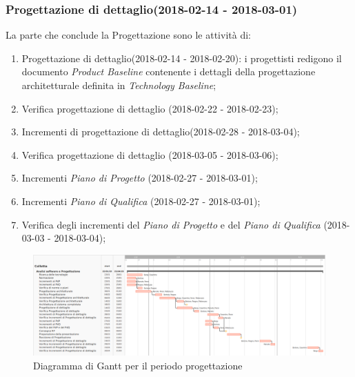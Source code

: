 		\subsubsection{Progettazione di dettaglio(2018-02-14 - 2018-03-01)\\} La parte che conclude la Progettazione sono le attività di:
			\begin{enumerate}
				\item Progettazione di dettaglio(2018-02-14 - 2018-02-20): i progettisti redigono il documento \textit{Product Baseline} contenente i dettagli della progettazione architetturale definita in \textit{Technology Baseline};
				\item Verifica progettazione di dettaglio (2018-02-22 - 2018-02-23);
				\item Incrementi di progettazione di dettaglio(2018-02-28 - 2018-03-04);
				\item Verifica progettazione di dettaglio (2018-03-05 - 2018-03-06);
				\item Incrementi \textit{Piano di Progetto} (2018-02-27 - 2018-03-01);
				\item Incrementi \textit{Piano di Qualifica} (2018-02-27 - 2018-03-01);	
				\item Verifica degli incrementi del \textit{Piano di Progetto} e del \textit{Piano di Qualifica} (2018-03-03 - 2018-03-04);
			\end{enumerate}
	\begin{figure}[!hbtp]
		\centering
		\includegraphics[scale=0.5,angle=90]{images/ganttprog.png}
		\caption{Diagramma di Gantt per il periodo progettazione}
	\end{figure}
	\newpage